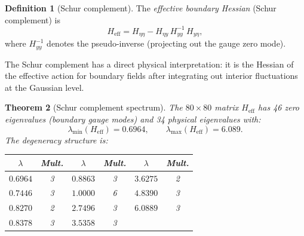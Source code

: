 \documentclass[11pt]{article}
\newtheorem{theorem}{Theorem}[section]
\theoremstyle{definition}
\newtheorem{definition}[theorem]{Definition}
\begin{document}
\begin{definition}[Schur complement]\label{def:schur}
The \emph{effective boundary Hessian} (Schur complement) is
\begin{equation}\label{eq:schur}
H_{\mathrm{eff}}=H_{\eta\eta}-H_{\eta y}\,H_{yy}^{-1}\,H_{y\eta},
\end{equation}
where $H_{yy}^{-1}$ denotes the pseudo-inverse (projecting out the
gauge zero mode).
\end{definition}

The Schur complement has a direct physical interpretation: it is the
Hessian of the effective action for boundary fields after integrating
out interior fluctuations at the Gaussian level.

\begin{theorem}[Schur complement spectrum]\label{thm:schur}
The $80\times 80$ matrix $H_{\mathrm{eff}}$ has 46 zero eigenvalues
(boundary gauge modes) and 34 physical eigenvalues with:
\begin{equation}
\lambda_{\min}(H_{\mathrm{eff}})=0.6964,\qquad
\lambda_{\max}(H_{\mathrm{eff}})=6.089.
\end{equation}
The degeneracy structure is:

\begin{center}
\begin{tabular}{cccccc}
\toprule
$\lambda$ & Mult. & $\lambda$ & Mult. & $\lambda$ & Mult.\\
\midrule
$0.6964$ & 3 & $0.8863$ & 3 & $3.6275$ & 2\\
$0.7446$ & 3 & $1.0000$ & 6 & $4.8390$ & 3\\
$0.8270$ & 2 & $2.7496$ & 3 & $6.0889$ & 3\\
$0.8378$ & 3 & $3.5358$ & 3 & &\\
\bottomrule
\end{tabular}
\end{center}
\end{theorem}
\end{document}
